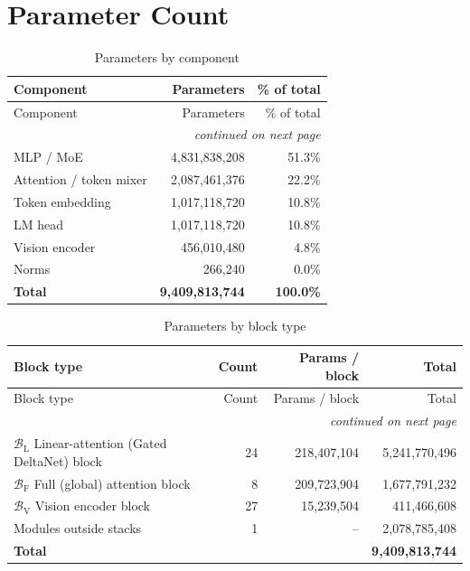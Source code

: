 \documentclass[10pt,a4paper]{article}
\theoremstyle{definition}
\begin{document}
\section{Parameter Count}
\begin{longtable}{lrr}
\caption{Parameters by component}\\
\toprule
Component & Parameters & \% of total \\
\midrule
\endfirsthead
\toprule
Component & Parameters & \% of total \\
\midrule
\endhead
\midrule \multicolumn{3}{r}{\textit{continued on next page}} \\
\endfoot
\bottomrule
\endlastfoot
MLP / MoE & 4,831,838,208 & 51.3\% \\
Attention / token mixer & 2,087,461,376 & 22.2\% \\
Token embedding & 1,017,118,720 & 10.8\% \\
LM head & 1,017,118,720 & 10.8\% \\
Vision encoder & 456,010,480 & 4.8\% \\
Norms & 266,240 & 0.0\% \\
\midrule \textbf{Total} & \textbf{9,409,813,744} & \textbf{100.0\%} \\
\end{longtable}
\begin{longtable}{p{8cm}rrr}
\caption{Parameters by block type}\\
\toprule
Block type & Count & Params / block & Total \\
\midrule
\endfirsthead
\toprule
Block type & Count & Params / block & Total \\
\midrule
\endhead
\midrule \multicolumn{4}{r}{\textit{continued on next page}} \\
\endfoot
\bottomrule
\endlastfoot
$\mathcal{B}_{\mathrm{L}}$ Linear-attention (Gated DeltaNet) block & 24 & 218,407,104 & 5,241,770,496 \\
$\mathcal{B}_{\mathrm{F}}$ Full (global) attention block & 8 & 209,723,904 & 1,677,791,232 \\
$\mathcal{B}_{\mathrm{V}}$ Vision encoder block & 27 & 15,239,504 & 411,466,608 \\
Modules outside stacks & 1 & -- & 2,078,785,408 \\
\midrule \textbf{Total} & & & \textbf{9,409,813,744} \\
\end{longtable}
\end{document}

